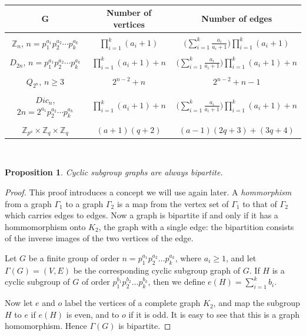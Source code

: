 \documentclass[11pt,twoside]{amsart}
\def \Z {{\mathbb{Z}}}
\def \Ga {{\Gamma }}
\newtheorem{pro}[theorem]{Proposition}
\begin{document}
\begin{table}[ht!]
\centering
\begin{tabular}{|c|c|c|}
 \hline
 $\mathbf{G}$ & \textbf{Number of vertices} & \textbf{Number of edges}\\
 \hline
  & &\\
  $\Z_n$, $n=p_1^{a_1}p_2^{a_2}\cdots p_k^{a_k}$ &
   $\prod_{i=1}^{k}(a_i+1)$ & $\bigg(\sum_{i=1}^{k}\frac{a_i}{a_i+1}\bigg)\prod_{i=1}^{k}(a_i+1)$\\
   \hline
    & &\\
  $D_{2n}$, $n=p_1^{a_1}p_2^{a_2}\cdots p_k^{a_k}$ & $\prod_{i=1}^{k}(a_i+1)+n$ &
    $\bigg(\sum_{i=1}^{k}\frac{a_i}{a_i+1}\bigg)\prod_{i=1}^{k}(a_i+1)+n$\\
    \hline
     & &\\
  $Q_{2^n}$, $n\geq 3$ & $2^{n-2}+n$ & $2^{n-2}+n-1$\\
  \hline
   & &\\
  $Dic_{n}$, $2n=2^{a_1}p_2^{a_2}\cdots p_k^{a_k}$ & $\prod_{i=1}^{k}(a_i+1)+n$ & $\bigg(\sum_{i=1}^{k}\frac{a_i}{a_i+1}\bigg)\prod_{i=1}^{k}(a_i+1)+n$\\
  \hline
   & &\\
  $\Z_{p^a}\times \Z_q\times \Z_q$ & $(a+1)(q+2)$ & $(a-1)(2q+3)+(3q+4)$\\

  \hline
 \end{tabular}\\
 \caption{}
           \label{tab:vertexedges}
       \end{table}
\begin{pro}\label{bipartite}
           Cyclic subgroup graphs are always bipartite.
       \end{pro}

       \begin{proof}
This proof introduces a concept we will use again later. A \emph{hommorphism}
from a graph $\Gamma_1$ to a graph $\Gamma_2$ is a map from the vertex set of
$\Gamma_1$ to that of $\Gamma_2$ which carries edges to edges. Now a graph is
bipartite if and only if it has a hommomorphism onto $K_2$, the graph with a
single edge: the bipartition consists of the inverse images of the two vertices
of the edge.

Let $G$ be a finite group of order $n=p_1^{a_1}p_2^{a_2}\dots p_k^{a_k}$, where $a_i\geq 1$, and let $\Ga(G)= (V, E)$ be the corresponding cyclic subgroup graph of $G$. If $H$ is a cyclic subgroup of $G$ of order $p_1^{b_1}p_2^{b_2}\dots p_k^{b_k}$, then we define $e(H)=\sum_{i=1}^{k}b_i$. 

Now let $e$ and $o$ label the vertices of a complete graph $K_2$, and map the
subgroup $H$ to $e$ if $e(H)$ is even, and to $o$ if it is odd. It is easy to
see that this is a graph homomorphism. Hence $\Ga(G)$ is bipartite.
\end{proof}
\end{document}
